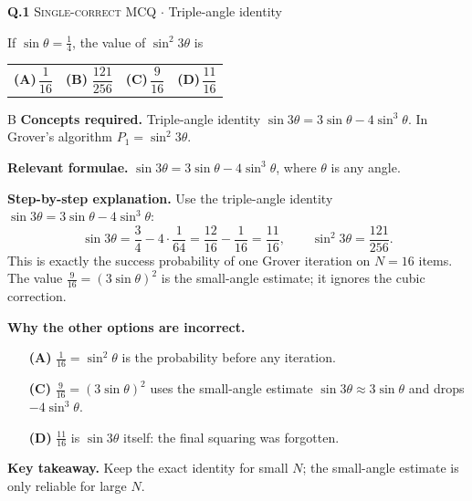 \documentclass[11pt,a4paper]{article}
\newcommand{\optlabel}[1]{\textbf{(#1)}}
\newcommand{\correctlabel}[1]{\textcolor{okgreen}{\textbf{(#1)}\,\ding{51}}}
\newenvironment{qitem}[1]{\begin{list}{}{\setlength{\leftmargin}{3.3em}\setlength{\labelwidth}{3.1em}%
  \setlength{\labelsep}{0.2em}\setlength{\topsep}{3pt}\setlength{\parsep}{3pt}}\item[\textbf{Q.#1}\hfill]}{\end{list}}
\newcommand{\qsep}{\par\vspace{2pt}{\color{black!15}\hrule}\vspace{4pt}}
\newcommand{\qmeta}[2]{{\footnotesize\color{black!60}\textsc{#1} \;$\cdot$\; #2}\par}
\begin{document}
\begin{qitem}{1}
\qmeta{Single-correct MCQ}{Triple-angle identity}
If $\sin\theta = \tfrac14$, the value of $\sin^2 3\theta$ is
\par\smallskip\noindent\begin{tabularx}{\linewidth}{@{}*{4}{L}@{}}
\optlabel{A}\,$\dfrac{1}{16}$ & \correctlabel{B}\,$\dfrac{121}{256}$ & \optlabel{C}\,$\dfrac{9}{16}$ & \optlabel{D}\,$\dfrac{11}{16}$
\end{tabularx}
\end{qitem}
\begin{solbox}{B}
\textbf{\color{brand}Concepts required.} Triple-angle identity $\sin3\theta = 3\sin\theta - 4\sin^3\theta$. In Grover's algorithm $P_1 = \sin^2 3\theta$.

\textbf{\color{brand}Relevant formulae.} $\sin3\theta = 3\sin\theta - 4\sin^3\theta$, where $\theta$ is any angle.

\textbf{\color{brand}Step-by-step explanation.} Use the triple-angle identity $\sin 3\theta = 3\sin\theta - 4\sin^3\theta$:
\[ \sin 3\theta = \frac34 - 4\cdot\frac{1}{64} = \frac{12}{16} - \frac{1}{16} = \frac{11}{16},
   \qquad \sin^2 3\theta = \frac{121}{256}. \]
This is exactly the success probability of one Grover iteration on $N = 16$ items.
The value $\frac{9}{16} = (3\sin\theta)^2$ is the small-angle estimate; it ignores the cubic correction.

\textbf{\color{brand}Why the other options are incorrect.}
\begin{itemize}[leftmargin=2.4em, itemsep=1pt, topsep=2pt]
\item[\textbf{(A)}] $\frac{1}{16} = \sin^2\theta$ is the probability before any iteration.
\item[\textbf{(C)}] $\frac{9}{16} = (3\sin\theta)^2$ uses the small-angle estimate $\sin3\theta \approx 3\sin\theta$ and drops $-4\sin^3\theta$.
\item[\textbf{(D)}] $\frac{11}{16}$ is $\sin3\theta$ itself: the final squaring was forgotten.
\end{itemize}
\textbf{\color{brand}Key takeaway.} Keep the exact identity for small $N$; the small-angle estimate is only reliable for large $N$.
\end{solbox}
\qsep
\end{document}
